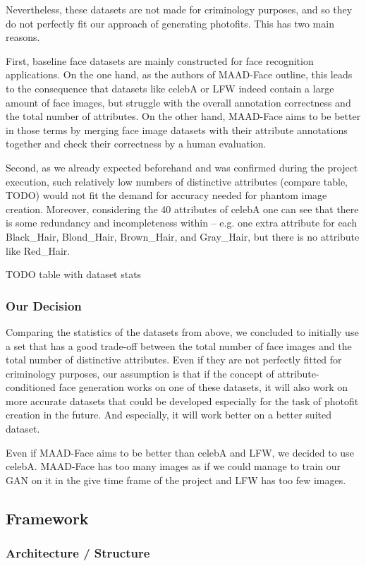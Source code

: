 \documentclass[12pt, a4paper]{article}
\begin{document}
Nevertheless, these datasets are not made for criminology purposes, and so they do not perfectly fit our approach of
generating photofits. This has two main reasons.

First, baseline face datasets are mainly constructed for face recognition applications. On the one hand, as the authors
of MAAD-Face outline, this leads to the consequence that datasets like
celebA or LFW indeed contain a large amount of face images, but struggle with the overall annotation correctness and the total number of attributes.
On the other hand, MAAD-Face aims to be better in those terms by merging
face image datasets with their attribute annotations together and check their correctness by a human evaluation.

Second, as we already expected beforehand and was confirmed during the project execution, such relatively low numbers of
distinctive attributes (compare table, TODO) would not fit the demand for accuracy needed for phantom image creation.
Moreover, considering the 40 attributes of celebA one can see that
there is some redundancy and incompleteness within -- e.g. one extra attribute for each Black\_Hair, Blond\_Hair,
Brown\_Hair, and Gray\_Hair, but there is no attribute like  Red\_Hair.

TODO table with dataset stats

\subsubsection{Our Decision}
Comparing the statistics of the datasets from above, we concluded to initially use a set that has a good trade-off
between the total number of face images and the total number of distinctive attributes. Even if they are not perfectly
fitted for criminology purposes, our assumption is that if the concept of attribute-conditioned face generation works on
one of these datasets, it will also work on more accurate datasets that could be developed especially for the task of
photofit creation in the future. And especially, it will work better on a better suited dataset.

Even if MAAD-Face aims to be better than
celebA and LFW, we decided to
use celebA. MAAD-Face has too many images as if we could manage to train our GAN on it in the give time frame of the project and LFW has too few images.
\subsection{Framework}
\subsubsection{Architecture / Structure}
\end{document}
